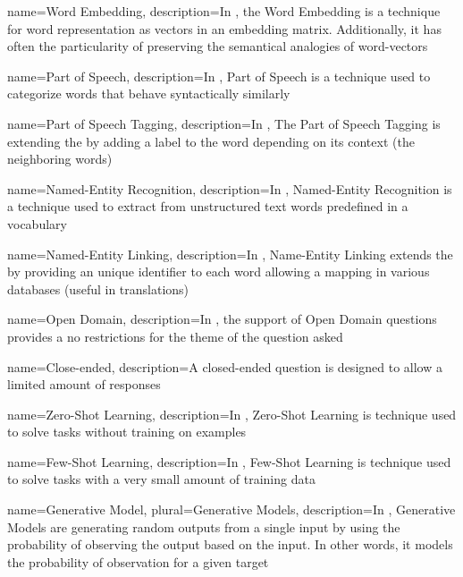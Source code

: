 {
  name={Word Embedding},
  description={In , the Word Embedding is a technique for word representation as vectors in an embedding matrix. Additionally, it has often the particularity of preserving the semantical analogies of word-vectors}
}

{
  name={Part of Speech},
  description={In , Part of Speech is a technique used to categorize words that behave syntactically similarly}
}

{
  name={Part of Speech Tagging},
  description={In , The Part of Speech Tagging is extending the  by adding a label to the word depending on its context (the neighboring words)}
}


{
  name={Named-Entity Recognition},
  description={In , Named-Entity Recognition is a technique used to extract from unstructured text words predefined in a vocabulary}
}

{
  name={Named-Entity Linking},
  description={In , Name-Entity Linking extends the  by providing an unique identifier to each word allowing a mapping in various databases (useful in translations)}
}

{
  name={Open Domain},
  description={In , the support of Open Domain questions provides a no restrictions for the theme of the question asked}
}

{
  name={Close-ended},
  description={A closed-ended question is designed to allow a limited amount of responses}
}

{
  name={Zero-Shot Learning},
  description={In , Zero-Shot Learning is technique used to solve tasks without training on examples}
}

{
  name={Few-Shot Learning},
  description={In , Few-Shot Learning is technique used to solve tasks with a very small amount of training data}
}

{
  name={Generative Model},
  plural={Generative Models},
  description={In , Generative Models are generating random outputs from a single input by using the probability of observing the output based on the input. In other words, it models the probability of observation for a given target}
}

